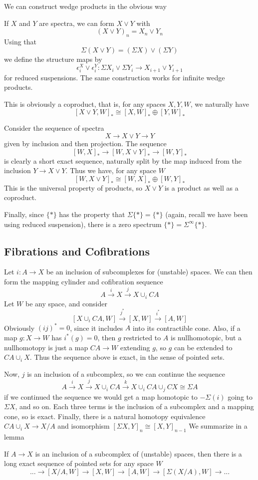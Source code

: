 We can construct wedge products in the obvious way
\begin{Def}
  If $X$ and $Y$ are spectra, we can form $X\vee Y$ with
  \[(X\vee Y)_n=X_n\vee Y_n\]
  Using that
  \[\Sigma(X\vee Y)=(\Sigma X)\vee (\Sigma Y)\]
  we define the structure maps by
  \[\epsilon^X_i\vee \epsilon^Y_i: \Sigma X_i\vee \Sigma Y_i\to X_{i+1}\vee Y_{i+1}\]
  for reduced suspensions.  The same construction works for infinite wedge products.  
\end{Def}
This is obviously a coproduct, that is, for any spaces $X,Y,W$, we naturally have
\[[X\vee Y,W]_*\cong [X,W]_*\oplus [Y,W]_*\]


Consider the sequence of spectra
\[X\to X\vee Y\to Y\]
given by inclusion and then projection.  The sequence
\[[W,X]_*\to [W, X\vee Y]_*\to [W,Y]_*\]
is clearly a short exact sequence, naturally split by the map induced from the inclusion $Y\to X\vee Y$.  
Thus we have, for any space $W$
\[[W,X\vee Y]_*\cong [W,X]_*\oplus [W,Y]_*\]
This is the universal property of products, so $X\vee Y$ is a product as well as a coproduct.  

Finally, since $\{*\}$ has the property that $\Sigma\{*\}=\{*\}$ (again, recall we have been using reduced suspension), there is a zero spectrum $\{*\}=\Sigma^\infty\{*\}$.  


\subsection{Fibrations and Cofibrations}

Let $i:A\to X$ be an inclusion of subcomplexes for (unstable) spaces.  
We can then form the mapping cylinder and cofibration sequence
\[A\xrightarrow{i} X\xrightarrow{j} X\cup_i CA\]
Let $W$ be any space, and consider
\[[X\cup_i CA,W]\xrightarrow{j^*} [X,W]\xrightarrow{i^*}[A,W]\]
Obviously $(ij)^*=0$, since it includes $A$ into its contractible cone.  
Also, if a map $g:X\to W$ has $i^*(g)=0$, then $g$ restricted to $A$ is nullhomotopic, but a nullhomotopy is just a map $CA\to W$ extending $g$, so $g$ can be extended to $CA\cup_i X$.  
Thus the sequence above is exact, in the sense of pointed sets.  

Now, $j$ is an inclusion of a subcomplex, so we can continue the sequence 
\[A\xrightarrow{i} X\xrightarrow{j} X\cup_i CA\xrightarrow{k} X\cup_i CA\cup_j CX\cong \Sigma A\]
if we continued the sequence we would get a map homotopic to $-\Sigma(i)$ going to $\Sigma X$, and so on.  
Each three terms is the inclusion of a subcomplex and a mapping cone, so is exact.  
Finally, there is a natural homotopy equivalence $CA\cup_i X\to X/A$ and isomorphism $[\Sigma X,Y]_n\cong [X,Y]_{n-1}$
We summarize in a lemma
\begin{Lemma}
  \label{sec:cofibspace}
  If $A\to X$ is an inclusion of a subcomplex of (unstable) spaces,  then there is a long exact sequence of pointed sets for any space $W$
  \[...\to [X/A,W]\to [X,W]\to [A,W]\to [\Sigma(X/A),W]\to ...\]
\end{Lemma}

